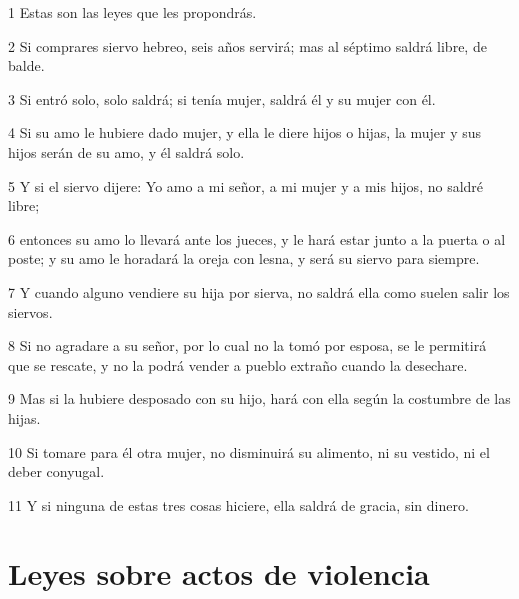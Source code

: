 \par 1 Estas son las leyes que les propondrás.
\par 2 Si comprares siervo hebreo, seis años servirá; mas al séptimo saldrá libre, de balde.
\par 3 Si entró solo, solo saldrá; si tenía mujer, saldrá él y su mujer con él.
\par 4 Si su amo le hubiere dado mujer, y ella le diere hijos o hijas, la mujer y sus hijos serán de su amo, y él saldrá solo.
\par 5 Y si el siervo dijere: Yo amo a mi señor, a mi mujer y a mis hijos, no saldré libre;
\par 6 entonces su amo lo llevará ante los jueces, y le hará estar junto a la puerta o al poste; y su amo le horadará la oreja con lesna, y será su siervo para siempre.
\par 7 Y cuando alguno vendiere su hija por sierva, no saldrá ella como suelen salir los siervos.
\par 8 Si no agradare a su señor, por lo cual no la tomó por esposa, se le permitirá que se rescate, y no la podrá vender a pueblo extraño cuando la desechare.
\par 9 Mas si la hubiere desposado con su hijo, hará con ella según la costumbre de las hijas.
\par 10 Si tomare para él otra mujer, no disminuirá su alimento, ni su vestido, ni el deber conyugal.
\par 11 Y si ninguna de estas tres cosas hiciere, ella saldrá de gracia, sin dinero.

\section*{Leyes sobre actos de violencia}

